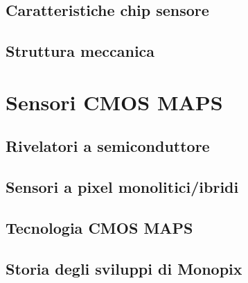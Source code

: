 \documentclass[10pt,a4paper,twoside]{report}
\begin{document}
\section{Caratteristiche chip sensore}



\section{Struttura meccanica}



\chapter{Sensori CMOS MAPS}


\section{Rivelatori a semiconduttore}

\section{Sensori a pixel monolitici/ibridi}

\section{Tecnologia CMOS MAPS}

\begin{comment}
small fill factor /large fill factor
\end{comment}

\section{Storia degli sviluppi di Monopix}
\end{document}
